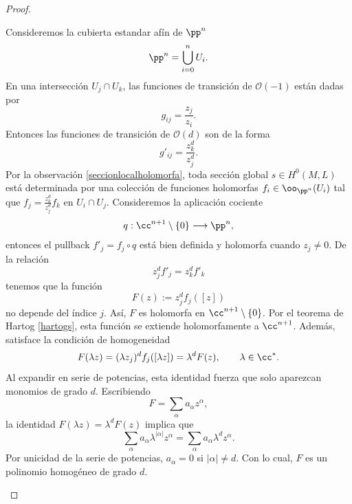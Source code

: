\begin{proof}
\begin{enumerate}
			Consideremos la cubierta estandar afín de $\pp^n$
			\begin{equation*}
				\pp^n=\bigcup_{i=0}^n U_i.
			\end{equation*}
			En una intersección $U_j\cap U_k$, las funciones de transición de $\mathcal{O}(-1)$ están dadas por 
			\begin{equation*}
				g_{ij}=\frac{z_j}{z_i}.
			\end{equation*}
			Entonces las funciones de transición de $\mathcal{O}(d)$ son de la forma
			\begin{equation*}
				g'_{ij}=\frac{z_k^d}{z_j^d}.
			\end{equation*}
			Por la observación \ref{seccionlocalholomorfa}, toda sección global $s\in H^0(M,L)$ está determinada por una colección de funciones holomorfas $f_i\in\oo_{\pp^n}(U_i)$ tal que $f_j=\frac{z_k^d}{z_j^d}f_k$ en $U_i\cap U_j$. Consideremos la aplicación cociente
			\begin{align*}
				q:\cc^{n+1}\setminus\{0\}\longrightarrow \pp^n,
			\end{align*}
			entonces el pullback $f'_j=f_j\circ q$ está bien definida y holomorfa cuando $z_j\neq 0$. De la relación
			\begin{equation*}
				z_j^df'_j=z_k^d f'_k
			\end{equation*}
			tenemos que la función
			\begin{equation*}
				F(z):=z_j^df_j([z])
			\end{equation*}
			no depende del índice $j$. Así, $F$ es holomorfa en $\cc^{n+1}\setminus\{0\}$. Por el teorema de Hartog \ref{hartogs}, esta función se extiende holomorfamente a $\cc^{n+1}$. Además, satisface la condición de homogeneidad 
			\begin{equation*}
				F(\lambda z)=(\lambda z_j)^d f_j([\lambda z])=\lambda^d F(z),\qquad \lambda\in\cc^*.
			\end{equation*}
			Al expandir en serie de potencias, esta identidad fuerza que solo aparezcan monomios de grado $d$. 
			Escribiendo
			\begin{equation*}
				F=\sum_\alpha a_\alpha z^\alpha,
			\end{equation*}
			la identidad $ F(\lambda z)=\lambda^dF(z)$ implica que
			\begin{equation*}
				\sum_\alpha a_\alpha \lambda^{|\alpha|}z^\alpha
				=
				\sum_\alpha a_\alpha \lambda^d z^\alpha.
			\end{equation*}
			Por unicidad de la serie de potencias,
			$a_\alpha=0$ si $|\alpha|\neq d$. Con lo cual, $F$ es un polinomio homogéneo de grado $d$.
			

\end{enumerate}
\end{proof}
